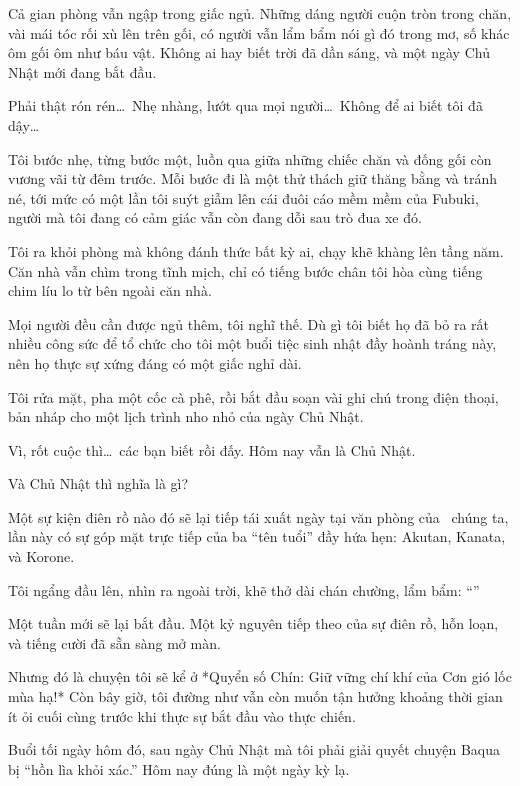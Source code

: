 \documentclass[../main.tex]{subfiles}
\begin{document}
Cả gian phòng vẫn ngập trong giấc ngủ. Những dáng người cuộn tròn trong chăn, vài mái tóc rối xù lên trên gối, có người vẫn lẩm bẩm nói gì đó trong mơ, số khác ôm gối ôm như báu vật. Không ai hay biết trời đã dần sáng, và một ngày Chủ Nhật mới đang bắt đầu.

Phải thật rón rén\dots\ Nhẹ nhàng, lướt qua mọi người\dots\ Không để ai biết tôi đã dậy\dots

Tôi bước nhẹ, từng bước một, luồn qua giữa những chiếc chăn và đống gối còn vương vãi từ đêm trước. Mỗi bước đi là một thử thách giữ thăng bằng và tránh né, tới mức có một lần tôi suýt giẫm lên cái đuôi cáo mềm mềm của Fubuki, người mà tôi đang có cảm giác vẫn còn đang dỗi sau trò đua xe đó.

Tôi ra khỏi phòng mà không đánh thức bất kỳ ai, chạy khẽ khàng lên tầng năm. Căn nhà vẫn chìm trong tĩnh mịch, chỉ có tiếng bước chân tôi hòa cùng tiếng chim líu lo từ bên ngoài căn nhà.

Mọi người đều cần được ngủ thêm, tôi nghĩ thế. Dù gì tôi biết họ đã bỏ ra rất nhiều công sức để tổ chức cho tôi một buổi tiệc sinh nhật đầy hoành tráng này, nên họ thực sự xứng đáng có một giấc nghỉ dài.

Tôi rửa mặt, pha một cốc cà phê, rồi bắt đầu soạn vài ghi chú trong điện thoại, bản nháp cho một lịch trình nho nhỏ của ngày Chủ Nhật.

Vì, rốt cuộc thì\dots\ các bạn biết rồi đấy. Hôm nay vẫn là Chủ Nhật.

Và Chủ Nhật thì nghĩa là gì?

Một sự kiện điên rồ nào đó sẽ lại tiếp tái xuất ngày tại văn phòng của \hll\ chúng ta, lần này có sự góp mặt trực tiếp của ba ``tên tuổi'' đầy hứa hẹn: Akutan, Kanata, và Korone.

Tôi ngẩng đầu lên, nhìn ra ngoài trời, khẽ thở dài chán chường, lẩm bẩm: ``''

Một tuần mới sẽ lại bắt đầu. Một kỷ nguyên tiếp theo của sự điên rồ, hỗn loạn, và tiếng cười đã sẵn sàng mở màn.

Nhưng đó là chuyện tôi sẽ kể ở *Quyển số Chín: Giữ vững chí khí của Cơn gió lốc mùa hạ!* Còn bây giờ, tôi đường như vẫn còn muốn tận hưởng khoảng thời gian ít ỏi cuối cùng trước khi thực sự bắt đầu vào thực chiến.

\ct

Buổi tối ngày hôm đó, sau ngày Chủ Nhật mà tôi phải giải quyết chuyện Baqua bị ``hồn lìa khỏi xác.'' Hôm nay đúng là một ngày kỳ lạ.
\end{document}
